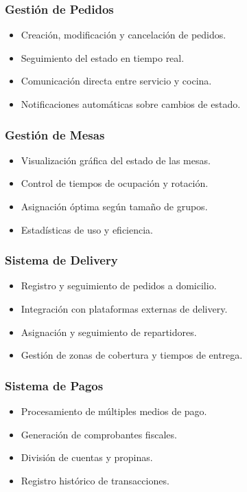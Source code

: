 \documentclass[12pt]{article}
\begin{document}
\subsubsection{Gestión de Pedidos}
\begin{itemize}
  \item Creación, modificación y cancelación de pedidos.
  \item Seguimiento del estado en tiempo real.
  \item Comunicación directa entre servicio y cocina.
  \item Notificaciones automáticas sobre cambios de estado.
\end{itemize}

\subsubsection{Gestión de Mesas}
\begin{itemize}
  \item Visualización gráfica del estado de las mesas.
  \item Control de tiempos de ocupación y rotación.
  \item Asignación óptima según tamaño de grupos.
  \item Estadísticas de uso y eficiencia.
\end{itemize}

\subsubsection{Sistema de Delivery}
\begin{itemize}
  \item Registro y seguimiento de pedidos a domicilio.
  \item Integración con plataformas externas de delivery.
  \item Asignación y seguimiento de repartidores.
  \item Gestión de zonas de cobertura y tiempos de entrega.
\end{itemize}

\subsubsection{Sistema de Pagos}
\begin{itemize}
  \item Procesamiento de múltiples medios de pago.
  \item Generación de comprobantes fiscales.
  \item División de cuentas y propinas.
  \item Registro histórico de transacciones.
\end{itemize}
\end{document}

